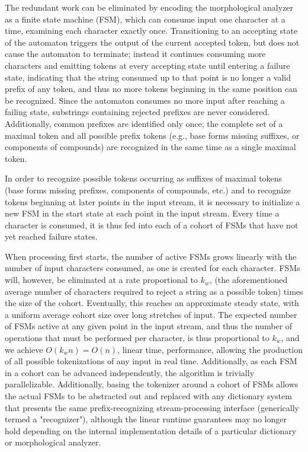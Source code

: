 The redundant work can be eliminated by encoding the morphological analyzer as a finite state machine (FSM), which can consume input one character at a time, examining each character exactly once. Transitioning to an accepting state of the automaton triggers the output of the current accepted token, but does not cause the automaton to terminate; instead it continues consuming more characters and emitting tokens at every accepting state until entering a failure state, indicating that the string consumed up to that point is no longer a valid prefix of any token, and thus no more tokens beginning in the same position can be recognized. Since the automaton consumes no more input after reaching a failing state, substrings containing rejected prefixes are never considered. Additionally, common prefixes are identified only once; the complete set of a maximal token and all possible prefix tokens (e.g., base forms missing suffixes, or components of compounds) are recognized in the same time as a single maximal token.

In order to recognize possible tokens occurring as suffixes of maximal tokens (base forms missing prefixes, components of compounds, etc.) and to recognize tokens beginning at later points in the input stream, it is necessary to initialize a new FSM in the start state at each point in the input stream. Every time a character is consumed, it is thus fed into each of a cohort of FSMs that have not yet reached failure states. 

When processing first starts, the number of active FSMs grows linearly with the number of input characters consumed, as one is created for each character. FSMs will, however, be eliminated at a rate proportional to $k_w$, (the aforementioned average number of characters required to reject a string as a possible token) times the size of the cohort. Eventually, this reaches an approximate steady state, with a uniform average cohort size over long stretches of input. The expected number of FSMs active at any given point in the input stream, and thus the number of operations that must be performed per character, is thus proportional to $k_w$, and we achieve $O(k_{w}n) = O(n)$, linear time, performance, allowing the production of all possible tokenizations of any input in real time. Additionally, as each FSM in a cohort can be advanced independently, the algorithm is trivially parallelizable. Additionally, basing the tokenizer around a cohort of FSMs allows the actual FSMs to be abstracted out and replaced with any dictionary system that presents the same prefix-recognizing stream-processing interface (generically termed a "recognizer"), although the linear runtime guarantees may no longer hold depending on the internal implementation details of a particular dictionary or morphological analyzer.

